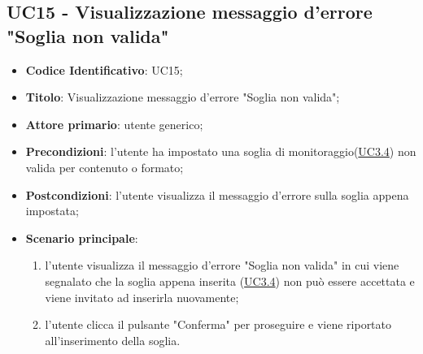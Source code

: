 	\subsection{UC15 - Visualizzazione messaggio d'errore "Soglia non valida"}
		\begin{itemize}
			\item\textbf{Codice Identificativo}: UC15;
			\item\textbf{Titolo}: Visualizzazione messaggio d'errore "Soglia non valida";
			\item\textbf{Attore primario}: utente generico;
			\item\textbf{Precondizioni}: l'utente ha impostato una soglia di monitoraggio(\hyperref[par:UC3.4]{UC3.4}) non valida per contenuto o formato;
			\item\textbf{Postcondizioni}: l'utente visualizza il messaggio d'errore sulla soglia appena impostata;		
			\item\textbf{Scenario principale}:
				\begin{enumerate}
					\item l'utente visualizza il messaggio d'errore "Soglia non valida" in cui viene segnalato che la soglia appena inserita (\hyperref[par:UC3.4]{UC3.4}) non può essere accettata e viene invitato ad inserirla nuovamente;
					\item l'utente clicca il pulsante "Conferma" per proseguire e viene riportato all'inserimento della soglia.		
				\end{enumerate}		
		\end{itemize}

	\label{par:UC16}
